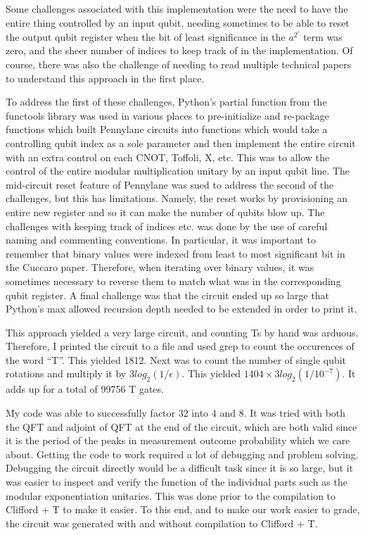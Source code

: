 \documentclass{article}
\begin{document}
Some challenges associated with this implementation were the need to have the entire thing controlled by an input qubit, needing sometimes to be able to reset the output qubit register when the bit of least significance in the $a^{2^i}$ term was zero, and the sheer number of indices to keep track of in the implementation. Of course, there was also the challenge of needing to read multiple technical papers to understand this approach in the first place.

To address the first of these challenges, Python's partial function from the functools library was used in various places to pre-initialize and re-package functions which built Pennylane circuits into functions which would take a controlling qubit index as a sole parameter and then implement the entire circuit with an extra control on each CNOT, Toffoli, X, etc. This was to allow the control of the entire modular multiplication unitary by an input qubit line. The mid-circuit reset feature of Pennylane was sued to address the second of the challenges, but this has limitations. Namely, the reset works by provisioning an entire new register and so it can make the number of qubits blow up. The challenges with keeping track of indices etc. was done by the use of careful naming and commenting conventions. In particular, it was important to remember that binary values were indexed from least to most significant bit in the Cuccaro paper. Therefore, when iterating over binary values, it was sometimes necessary to reverse them to match what was in the corresponding qubit register.
A final challenge was that the circuit ended up so large that Python's max allowed recursion depth needed to be extended in order to print it.

This approach yielded a very large circuit, and counting Ts by hand was arduous. Therefore, I printed the circuit to a file and used grep to count the occurences of the word ``T''. This yielded 1812. Next was to count the number of single qubit rotations and multiply it by $3 log_2(1/\epsilon)$. This yielded $1404 \times 3 log_2(1/10^{-7})$. It adds up for a total of 99756 T gates.

My code was able to successfully factor 32 into 4 and 8. It was tried with both the QFT and adjoint of QFT at the end of the circuit, which are both valid since it is the period of the peaks in measurement outcome probability which we care about. Getting the code to work required a lot of debugging and problem solving. Debugging the circuit directly would be a difficult task since it is so large, but it was easier to inspect and verify the function of the individual parts such as the modular exponentiation unitaries. This was done prior to the compilation to Clifford + T to make it easier. To this end, and to make our work easier to grade, the circuit was generated with and without compilation to Clifford + T.



\end{document}
